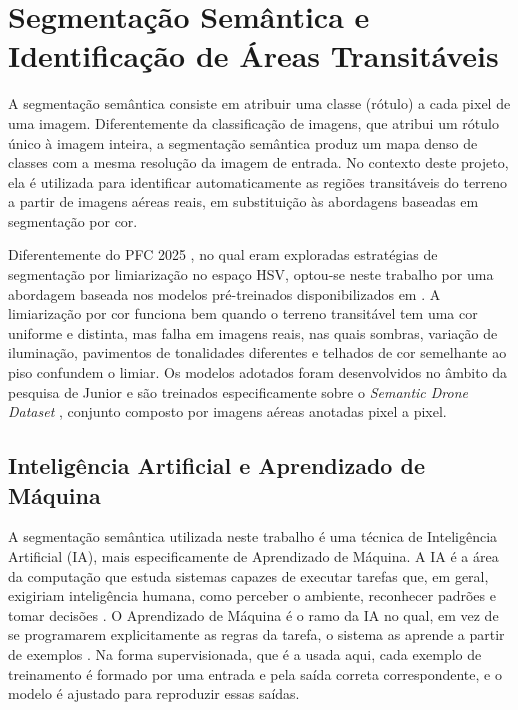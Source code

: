 \documentclass[
    12pt,
    openright,
    oneside,
    a4paper,
    english,
    brazil
]{abntex2}
\begin{document}
\section{Segmentação Semântica e Identificação de Áreas Transitáveis}
\label{sec:segmentacao}

A segmentação semântica consiste em atribuir uma classe (rótulo) a cada pixel de uma imagem. Diferentemente da classificação de imagens, que atribui um rótulo único à imagem inteira, a segmentação semântica produz um mapa denso de classes com a mesma resolução da imagem de entrada. No contexto deste projeto, ela é utilizada para identificar automaticamente as regiões transitáveis do terreno a partir de imagens aéreas reais, em substituição às abordagens baseadas em segmentação por cor.

Diferentemente do PFC 2025 \cite{camelo2025}, no qual eram exploradas estratégias de segmentação por limiarização no espaço HSV, optou-se neste trabalho por uma abordagem baseada nos modelos pré-treinados disponibilizados em \cite{junior2024_models}. A limiarização por cor funciona bem quando o terreno transitável tem uma cor uniforme e distinta, mas falha em imagens reais, nas quais sombras, variação de iluminação, pavimentos de tonalidades diferentes e telhados de cor semelhante ao piso confundem o limiar. Os modelos adotados foram desenvolvidos no âmbito da pesquisa de Junior \cite{junior2024} e são treinados especificamente sobre o \emph{Semantic Drone Dataset} \cite{drone_dataset}, conjunto composto por imagens aéreas anotadas pixel a pixel.

\subsection{Inteligência Artificial e Aprendizado de Máquina}
\label{sec:ia}

A segmentação semântica utilizada neste trabalho é uma técnica de Inteligência Artificial (IA), mais especificamente de Aprendizado de Máquina. A IA é a área da computação que estuda sistemas capazes de executar tarefas que, em geral, exigiriam inteligência humana, como perceber o ambiente, reconhecer padrões e tomar decisões \cite{russell2020}. O Aprendizado de Máquina é o ramo da IA no qual, em vez de se programarem explicitamente as regras da tarefa, o sistema as aprende a partir de exemplos \cite{mitchell1997}. Na forma supervisionada, que é a usada aqui, cada exemplo de treinamento é formado por uma entrada e pela saída correta correspondente, e o modelo é ajustado para reproduzir essas saídas.
\end{document}
